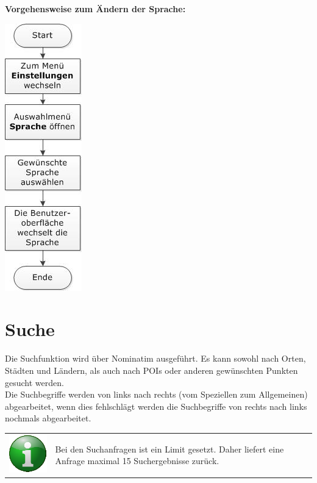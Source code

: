 \documentclass[10pt]{scrreprt}
\begin{document}
\begin{figure}[!htb]
\end{figure} 

\vspace{3mm}
\textbf{Vorgehensweise zum Ändern der Sprache:}
\vspace{3mm}
\begin{center}
\includegraphics[scale=0.7]{images/sprache.jpeg}
\end{center}



\newpage
\section{Suche} 
Die Suchfunktion wird über Nominatim  ausgeführt. Es kann sowohl nach Orten, Städten und Ländern, als auch nach POIs oder anderen gewünschten Punkten gesucht werden.\\

Die Suchbegriffe werden von links nach rechts (vom Speziellen zum Allgemeinen) abgearbeitet, wenn dies fehlschlägt werden die Suchbegriffe von rechts nach links nochmals abgearbeitet.\\

\vspace{3mm}
\begin{tabular}{>{\centering \arraybackslash}m{1cm} m{14cm}}
\includegraphics[scale=0.5]{images/info.eps} & Bei den Suchanfragen ist ein Limit gesetzt. Daher liefert eine Anfrage maximal 15 Suchergebnisse zurück. \\ 
\end{tabular} 
\end{document}
